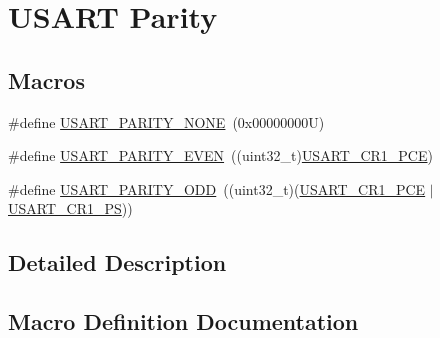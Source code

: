 \hypertarget{group___u_s_a_r_t___parity}{}\section{U\+S\+A\+RT Parity}
\label{group___u_s_a_r_t___parity}
\subsection*{Macros}
\begin{DoxyCompactItemize}
\item 
\#define \hyperlink{group___u_s_a_r_t___parity_ga85bfcbeb5ba1c34bbcda3f3e3b994846}{U\+S\+A\+R\+T\+\_\+\+P\+A\+R\+I\+T\+Y\+\_\+\+N\+O\+NE}~(0x00000000\+U)
\item 
\#define \hyperlink{group___u_s_a_r_t___parity_gae7630824c78a39366b7e5b4c55996200}{U\+S\+A\+R\+T\+\_\+\+P\+A\+R\+I\+T\+Y\+\_\+\+E\+V\+EN}~((uint32\+\_\+t)\hyperlink{group___peripheral___registers___bits___definition_ga60f8fcf084f9a8514efafb617c70b074}{U\+S\+A\+R\+T\+\_\+\+C\+R1\+\_\+\+P\+CE})
\item 
\#define \hyperlink{group___u_s_a_r_t___parity_ga184f3e22cb30ea94b797b02e94e774a1}{U\+S\+A\+R\+T\+\_\+\+P\+A\+R\+I\+T\+Y\+\_\+\+O\+DD}~((uint32\+\_\+t)(\hyperlink{group___peripheral___registers___bits___definition_ga60f8fcf084f9a8514efafb617c70b074}{U\+S\+A\+R\+T\+\_\+\+C\+R1\+\_\+\+P\+CE} $\vert$ \hyperlink{group___peripheral___registers___bits___definition_ga2e159d36ab2c93a2c1942df60e9eebbe}{U\+S\+A\+R\+T\+\_\+\+C\+R1\+\_\+\+PS}))
\end{DoxyCompactItemize}


\subsection{Detailed Description}


\subsection{Macro Definition Documentation}
\mbox{\label{group___u_s_a_r_t___parity_gae7630824c78a39366b7e5b4c55996200}} 
